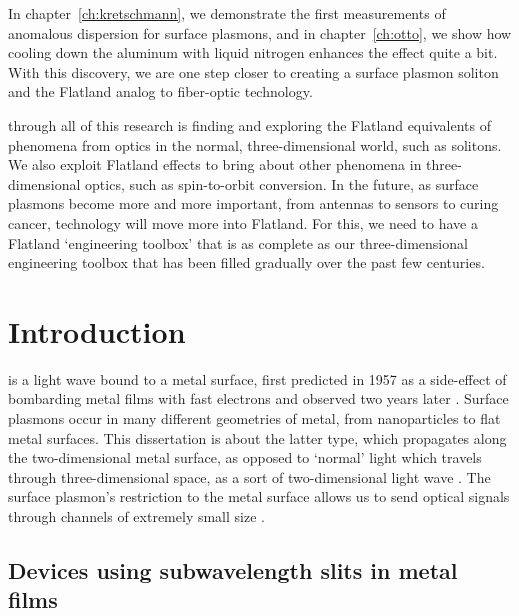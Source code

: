 In chapter~\ref{ch:kretschmann}, we demonstrate the first measurements of anomalous dispersion for surface plasmons, and in chapter~\ref{ch:otto}, we show how cooling down the aluminum with liquid nitrogen enhances the effect quite a bit.
With this discovery, we are one step closer to creating a surface plasmon soliton and the Flatland analog to fiber-optic technology.

 through all of this research is finding and exploring the Flatland equivalents of phenomena from optics in the normal, three-dimensional world, such as solitons.
We also exploit Flatland effects to bring about other phenomena in three-dimensional optics, such as spin-to-orbit conversion.
In the future, as surface plasmons become more and more important, from antennas to sensors to curing cancer, technology will move more into Flatland.
For this, we need to have a Flatland `engineering toolbox' that is as complete as our three-dimensional engineering toolbox that has been filled gradually over the past few centuries.

\chapter{Introduction}


 is a light wave bound to a metal surface, first predicted in 1957 as a side-effect of  bombarding metal films with fast electrons \cite{Ritchie1957} and observed two years later \cite{Powell1959}.
Surface plasmons occur in many different geometries of metal, from nanoparticles \cite{Moskovits1985} to flat metal surfaces.
This dissertation is about the latter type, which propagates along the two-dim\-en\-sion\-al metal surface, as opposed to `normal' light which travels through three-dim\-en\-sion\-al space, as a sort of two-dimensional light wave \cite{Bell1975,Bozhevolnyi1997,Ditlbacher2002}.
The surface plasmon's restriction to the metal surface allows us to send optical signals through channels of extremely small size \cite{Maier2005,GarciaVidal2006}.

\section{Devices using subwavelength slits in metal films}

